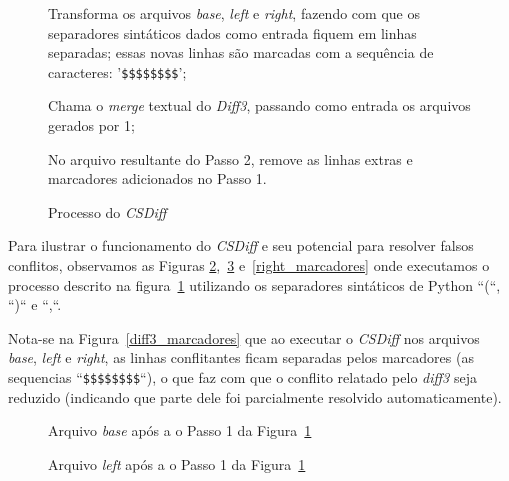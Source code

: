 \begin{figure}[ht]
	\begin{center}
		\begin{compactenum}[(1)]
            \item Transforma os arquivos \emph{base}, \emph{left} e
                \emph{right}, fazendo com que os separadores sintáticos dados
                como entrada fiquem em linhas separadas; essas novas linhas são
                marcadas com a sequência de caracteres: '\verb|$$$$$$$$|';
            \item Chama o \emph{merge} textual do \emph{Diff3}, passando como
                entrada os arquivos gerados por 1;
            \item No arquivo resultante do Passo 2, remove as linhas extras e
                marcadores adicionados no Passo 1.
		\end{compactenum}
	\end{center}
	\caption{Processo do \emph{CSDiff}}\label{csdiff_process}
\end{figure}


Para ilustrar o funcionamento do \emph{CSDiff} e seu potencial para resolver
falsos conflitos, observamos as Figuras
\ref{base_marcadores},~\ref{left_marcadores} e~\ref{right_marcadores} onde
executamos o processo descrito na figura~\ref{csdiff_process} utilizando os
separadores sintáticos de Python ``(``, ``)``  e ``,``.

Nota-se na Figura~\ref{diff3_marcadores} que ao executar o \emph{CSDiff} nos
arquivos \emph{base}, \emph{left} e \emph{right}, as linhas conflitantes ficam
separadas pelos marcadores (as sequencias ``\verb|$$$$$$$$|``), o que faz com que
o conflito relatado pelo \emph{diff3} seja reduzido (indicando que parte dele
foi parcialmente resolvido automaticamente).

\begin{figure}[ht]
	\begin{center}
        
        \caption{Arquivo \emph{base} após a o Passo 1 da
        Figura~\ref{csdiff_process}}\label{base_marcadores}
	\end{center}
\end{figure}

\begin{figure}[ht]
	\begin{center}
		
        \caption{Arquivo \emph{left} após a o Passo 1 da
        Figura~\ref{csdiff_process}}\label{left_marcadores}
	\end{center}
\end{figure}

